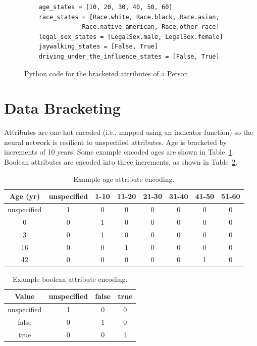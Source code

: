 \documentclass[paper=a4paper]{report}
\begin{document}
\begin{figure}[h]
    \centering
    \begin{verbatim}
    age_states = [10, 20, 30, 40, 50, 60]
    race_states = [Race.white, Race.black, Race.asian,
                Race.native_american, Race.other_race]
    legal_sex_states = [LegalSex.male, LegalSex.female]
    jaywalking_states = [False, True]
    driving_under_the_influence_states = [False, True]
    \end{verbatim}
    \caption{Python code for the bracketed attributes of a Person}
    \label{fig:code_for_person_attribute_domains}
\end{figure}

\FloatBarrier
\section{Data Bracketing}
\label{sec:data-bracketing}

Attributes are one-hot encoded (i.e., mapped using an indicator function) so the neural network is
resilient to unspecified attributes. Age is bracketed by increments of 10 years. Some example
encoded ages are shown in Table~\ref{tab:example_age_attribute_encoding}. Boolean attributes are
encoded into three increments, as shown in Table~\ref{tab:example_boolean_attribute_encoding}.
    
\begin{table}[h]
    \centering
    \begin{tabular}{c|c|c|c|c|c|c|c}
        Age (yr) & unspecified & 1-10 & 11-20 & 21-30 & 31-40 & 41-50 & 51-60 \\\hline
        unspecified & 1 & 0 & 0 & 0 & 0 & 0 & 0 \\
        0 & 0 & 1 & 0 & 0 & 0 & 0 & 0 \\
        3 & 0 & 1 & 0 & 0 & 0 & 0 & 0 \\
        16 & 0 & 0 & 1 & 0 & 0 & 0 & 0 \\
        42 & 0 & 0 & 0 & 0 & 0 & 1 & 0
    \end{tabular}
    \caption{Example age attribute encoding.}
    \label{tab:example_age_attribute_encoding}
\end{table}

\begin{table}[h]
    \centering
    \begin{tabular}{c|c|c|c}
        Value & unspecified & false & true \\\hline
        unspecified & 1 & 0 & 0 \\
        false & 0 & 1 & 0 \\
        true & 0 & 0 & 1
    \end{tabular}
    \caption{Example boolean attribute encoding.}
    \label{tab:example_boolean_attribute_encoding}
\end{table}
\end{document}
